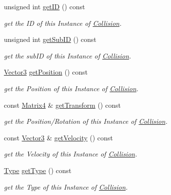 \begin{DoxyCompactItemize}
unsigned int \hyperlink{class_magnum_1_1_collision_a8b48c9d3da28892730e5ead328989f6b}{get\+ID} () const 
\begin{DoxyCompactList}\small\item\em get the ID of this Instance of \hyperlink{class_magnum_1_1_collision}{Collision}. \end{DoxyCompactList}\item 
unsigned int \hyperlink{class_magnum_1_1_collision_a7975bf1fe6ed60afbf3e4faa50561096}{get\+Sub\+ID} () const 
\begin{DoxyCompactList}\small\item\em get the sub\+ID of this Instance of \hyperlink{class_magnum_1_1_collision}{Collision}. \end{DoxyCompactList}\item 
\hyperlink{class_magnum_1_1_vector3}{Vector3} \hyperlink{class_magnum_1_1_collision_a759c9902ad30a31dca7e3ba0ad9e4f01}{get\+Position} () const 
\begin{DoxyCompactList}\small\item\em get the Position of this Instance of \hyperlink{class_magnum_1_1_collision}{Collision}. \end{DoxyCompactList}\item 
const \hyperlink{class_magnum_1_1_matrix4}{Matrix4} \& \hyperlink{class_magnum_1_1_collision_aed5c534471618d2057cafb33fe0f9a9d}{get\+Transform} () const 
\begin{DoxyCompactList}\small\item\em get the Position/\+Rotation of this Instance of \hyperlink{class_magnum_1_1_collision}{Collision}. \end{DoxyCompactList}\item 
const \hyperlink{class_magnum_1_1_vector3}{Vector3} \& \hyperlink{class_magnum_1_1_collision_ab1987f6bf0de0317b0ba6eff42360105}{get\+Velocity} () const 
\begin{DoxyCompactList}\small\item\em get the Velocity of this Instance of \hyperlink{class_magnum_1_1_collision}{Collision}. \end{DoxyCompactList}\item 
\hyperlink{class_magnum_1_1_collision_af96418629e7663358a39f8138bc412a7}{Type} \hyperlink{class_magnum_1_1_collision_a7874ca06ee40066bb822e31194a932dd}{get\+Type} () const 
\begin{DoxyCompactList}\small\item\em get the Type of this Instance of \hyperlink{class_magnum_1_1_collision}{Collision}. \end{DoxyCompactList}\item 

\end{DoxyCompactItemize}

